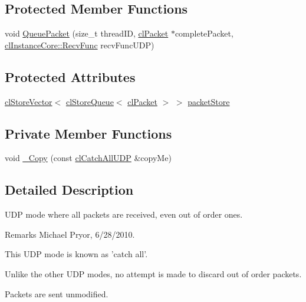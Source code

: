 \subsection*{Protected Member Functions}
\begin{DoxyCompactItemize}
\item 
void \hyperlink{classcl_catch_all_u_d_p_aab82a0c6997adb14f317f71da6db52b1}{QueuePacket} (size\_\-t threadID, \hyperlink{classcl_packet}{clPacket} $\ast$completePacket, \hyperlink{classcl_instance_core_afa96c2a2c0b26b6a9256b87798bf9587}{clInstanceCore::RecvFunc} recvFuncUDP)
\end{DoxyCompactItemize}
\subsection*{Protected Attributes}
\begin{DoxyCompactItemize}
\item 
\hyperlink{classcl_store_vector}{clStoreVector}$<$ \hyperlink{classcl_store_queue}{clStoreQueue}$<$ \hyperlink{classcl_packet}{clPacket} $>$ $>$ \hyperlink{classcl_catch_all_u_d_p_a8c46150bb5f8219841e47561b6c96f30}{packetStore}
\end{DoxyCompactItemize}
\subsection*{Private Member Functions}
\begin{DoxyCompactItemize}
\item 
void \hyperlink{classcl_catch_all_u_d_p_ac5e4e6633deffddd00a93b55e759fcc2}{\_\-Copy} (const \hyperlink{classcl_catch_all_u_d_p}{clCatchAllUDP} \&copyMe)
\end{DoxyCompactItemize}


\subsection{Detailed Description}
UDP mode where all packets are received, even out of order ones. \begin{DoxyRemark}{Remarks}
Michael Pryor, 6/28/2010.
\end{DoxyRemark}
This UDP mode is known as 'catch all'. \par
\par


Unlike the other UDP modes, no attempt is made to discard out of order packets. \par
 Packets are sent unmodified. \par
\par


